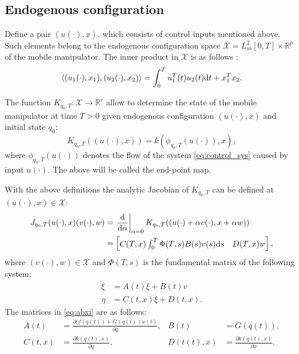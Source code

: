 \subsection{Endogenous configuration}
Define a pair $(u(\cdot), x)$, which consists of control inputs mentioned above.
Such elements belong to the endogenous configuration space
$\mathcal{X} = L_m^2[0, T] \times \mathbb{R}^p$ of the mobile manipulator.
The inner product in $\mathcal{X}$ is as follows \cite{ecs_ijc}:
\begin{equation}
\langle (u_1(\cdot), x_1), (u_2(\cdot), x_2) \rangle = \int_0^T u_1^T(t) u_2(t) \mathrm{d} t + x_1^T x_2.
\end{equation}

The function
$K_{q_0, T}: \mathcal{X} \rightarrow \mathbb{R}^r$
allow to determine the state of the mobile manipulator at time $T>0$ given
endogenous configuration $(u(\cdot), x)$ and initial state $q_0$:
\begin{equation}
K_{q_0, T}((u(\cdot), x)) = k(\phi_{q_0, T}(u(\cdot)), x),
\end{equation}
where $\phi_{q_0, T}(u(\cdot))$ denotes the flow of the system \eqref{eq:control_sys}
caused by input $u(\cdot)$. The above will be called the end-point map.

With the above definitions the analytic Jacobian of $K_{q_0, T}$ can be defined at $(u(\cdot), x) \in \mathcal{X}$:
\begin{align}
J_{q_0, T}(u(\cdot), x)(v(\cdot), w) &= \left.\frac{\mathrm{d}}{\mathrm{d} \alpha}\right|_{\alpha=0} K_{q_0, T}((u(\cdot)+\alpha v(\cdot), x+\alpha w))\\
 &= \begin{bmatrix}
 C(T,x)\int_0^T \Phi(T,s)B(s)v(s)\mathrm{d} s & D(T,x)w \end{bmatrix} ,
\end{align}
where $(v(\cdot), w)\in \mathcal{X}$ and $\Phi(T,s)$ is the fundamental matrix of the following system:
\begin{equation}
\begin{aligned}
\label{eq:abxi}
\dot \xi &= A(t)\xi + B(t) v \\
\eta &= C(t, x)\xi + D(t, x).
\end{aligned}
\end{equation}
The matrices in \eqref{eq:abxi} are as follows:
\begin{equation}
\begin{aligned}
A(t) &= \frac{\partial (f(q(t))+G(q(t))u(t)}{\partial q}, & B(t) &= G(q(t)),\\
C(t, x) &= \frac{\partial k(q(t), x)}{\partial q}, & D(t(t), x) &= \frac{\partial k(q(t), x)}{\partial x}.
\end{aligned}
\end{equation}

